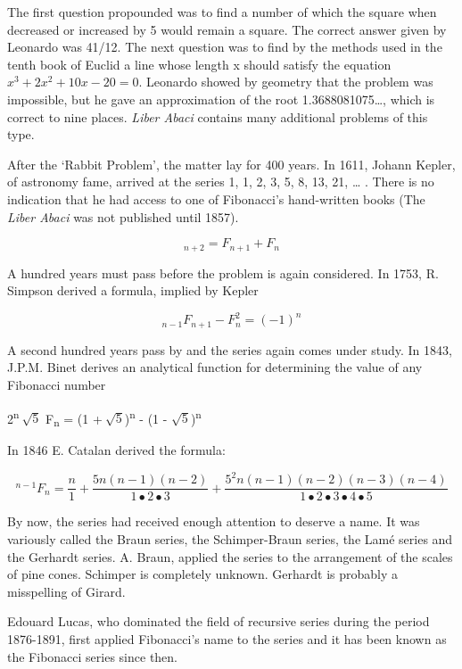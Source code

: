 \documentclass[10pt,letter]{article}
\begin{document}
The first question propounded was to find a number of which the square
when decreased or increased by 5 would remain a square. The correct
answer given by Leonardo was 41/12. The next question was to find by the
methods used in the tenth book of Euclid a line whose length x should
satisfy the equation $x^3 + 2x^2 + 10x - 20 = 0$. Leonardo showed by
geometry that the problem was impossible, but he gave an approximation
of the root 1.3688081075\ldots{}, which is correct to nine places.
\emph{Liber Abaci} contains many additional problems of this type.

After the `Rabbit Problem', the matter lay for 400 years. In 1611,
Johann Kepler, of astronomy fame, arrived at the series 1, 1, 2, 3, 5,
8, 13, 21, \ldots{} . There is no indication that he had access to one
of Fibonacci's hand-written books (The \emph{Liber Abaci} was not
published until 1857).

\[
_{n + 2} = F_{n + 1} + F_{n}
\]

A hundred years must pass before the problem is again considered. In
1753, R. Simpson derived a formula, implied by Kepler

\[
_{n - 1}F_{n + 1} - F_{n}^{2} = \left( - 1 \right)^{n}
\]

A second hundred years pass by and the series again comes under study.
In 1843, J.P.M. Binet derives an analytical function for determining the
value of any Fibonacci number

2\textsuperscript{n}\(\ \sqrt{5}\) F\textsubscript{n} = (1
+\(\ \sqrt{5}\))\textsuperscript{n} - (1 -
\(\sqrt{5}\))\textsuperscript{n}

In 1846 E. Catalan derived the formula:

\[
^{n - 1}F_{n} = \frac{n}{1} + \frac{5n\left( n - 1 \right)\left( n - 2 \right)}{1 \bullet 2 \bullet 3} + \frac{5^{2}n\left( n - 1 \right)\left( n - 2 \right)\left( n - 3 \right)\left( n - 4 \right)}{1 \bullet 2 \bullet 3 \bullet 4 \bullet 5}
\]

By now, the series had received enough attention to deserve a name. It
was variously called the Braun series, the Schimper-Braun series, the
Lamé series and the Gerhardt series. A. Braun, applied the series to the
arrangement of the scales of pine cones. Schimper is completely unknown.
Gerhardt is probably a misspelling of Girard.

Edouard Lucas, who dominated the field of recursive series during the
period 1876-1891, first applied Fibonacci's name to the series and it
has been known as the Fibonacci series since then.
\end{document}
